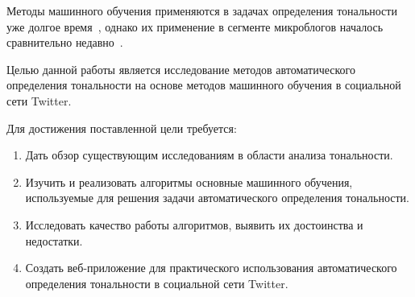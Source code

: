 Методы машинного обучения применяются в задачах определения тональности 
уже долгое время~\cite{panglee}, однако их применение в сегменте микроблогов 
началось сравнительно недавно~\cite{distsuperv}.

\vspace{0.5cm}

Целью данной работы является исследование методов автоматического 
определения тональности на основе методов машинного обучения в социальной 
сети Twitter. 

Для достижения поставленной цели требуется:

\begin{enumerate}

\item 
Дать обзор существующим исследованиям в области анализа тональности.

\item 
Изучить и реализовать алгоритмы основные машинного обучения, используемые 
для решения задачи автоматического определения тональности.

\item 
Исследовать качество работы алгоритмов, выявить их достоинства и недостатки.

\item 
Создать веб-приложение для практического использования автоматического 
определения тональности в социальной сети Twitter. 

\end{enumerate}